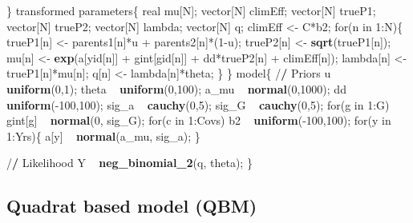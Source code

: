 \documentclass[12pt,]{article}
\newenvironment{Shaded}{\begin{snugshade}}{\end{snugshade}}
\newcommand{\KeywordTok}[1]{\textcolor[rgb]{0.13,0.29,0.53}{\textbf{{#1}}}}
\newcommand{\DecValTok}[1]{\textcolor[rgb]{0.00,0.00,0.81}{{#1}}}
\newcommand{\StringTok}[1]{\textcolor[rgb]{0.31,0.60,0.02}{{#1}}}
\newcommand{\ErrorTok}[1]{\textbf{{#1}}}
\newcommand{\NormalTok}[1]{{#1}}
\begin{document}
\begin{Shaded}
\begin{Highlighting}[]
\NormalTok{\}}
\NormalTok{transformed parameters\{}
  \NormalTok{real mu[N];}
  \NormalTok{vector[N] climEff;}
  \NormalTok{vector[N] trueP1;}
  \NormalTok{vector[N] trueP2;}
  \NormalTok{vector[N] lambda;}
  \NormalTok{vector[N] q;}
  \NormalTok{climEff <-}\StringTok{ }\NormalTok{C*b2;}
  \NormalTok{for(n in }\DecValTok{1}\NormalTok{:N)\{}
    \NormalTok{trueP1[n] <-}\StringTok{ }\NormalTok{parents1[n]*u +}\StringTok{ }\NormalTok{parents2[n]*(}\DecValTok{1}\NormalTok{-u);}
    \NormalTok{trueP2[n] <-}\StringTok{ }\KeywordTok{sqrt}\NormalTok{(trueP1[n]);}
    \NormalTok{mu[n] <-}\StringTok{ }\KeywordTok{exp}\NormalTok{(a[yid[n]] +}\StringTok{ }\NormalTok{gint[gid[n]] +}\StringTok{ }\NormalTok{dd*trueP2[n] +}\StringTok{ }\NormalTok{climEff[n]);}
    \NormalTok{lambda[n] <-}\StringTok{ }\NormalTok{trueP1[n]*mu[n];}
    \NormalTok{q[n] <-}\StringTok{ }\NormalTok{lambda[n]*theta;}
  \NormalTok{\}}
\NormalTok{\}}
\NormalTok{model\{}
  \NormalTok{/}\ErrorTok{/}\StringTok{ }\NormalTok{Priors}
  \NormalTok{u ~}\StringTok{ }\KeywordTok{uniform}\NormalTok{(}\DecValTok{0}\NormalTok{,}\DecValTok{1}\NormalTok{);}
  \NormalTok{theta ~}\StringTok{ }\KeywordTok{uniform}\NormalTok{(}\DecValTok{0}\NormalTok{,}\DecValTok{100}\NormalTok{);}
  \NormalTok{a_mu ~}\StringTok{ }\KeywordTok{normal}\NormalTok{(}\DecValTok{0}\NormalTok{,}\DecValTok{1000}\NormalTok{);}
  \NormalTok{dd ~}\StringTok{ }\KeywordTok{uniform}\NormalTok{(-}\DecValTok{100}\NormalTok{,}\DecValTok{100}\NormalTok{);}
  \NormalTok{sig_a ~}\StringTok{ }\KeywordTok{cauchy}\NormalTok{(}\DecValTok{0}\NormalTok{,}\DecValTok{5}\NormalTok{);}
  \NormalTok{sig_G ~}\StringTok{ }\KeywordTok{cauchy}\NormalTok{(}\DecValTok{0}\NormalTok{,}\DecValTok{5}\NormalTok{);}
  \NormalTok{for(g in }\DecValTok{1}\NormalTok{:G)}
      \NormalTok{gint[g] ~}\StringTok{ }\KeywordTok{normal}\NormalTok{(}\DecValTok{0}\NormalTok{, sig_G);}
  \NormalTok{for(c in }\DecValTok{1}\NormalTok{:Covs)}
    \NormalTok{b2 ~}\StringTok{ }\KeywordTok{uniform}\NormalTok{(-}\DecValTok{100}\NormalTok{,}\DecValTok{100}\NormalTok{);}
  \NormalTok{for(y in }\DecValTok{1}\NormalTok{:Yrs)\{}
    \NormalTok{a[y] ~}\StringTok{ }\KeywordTok{normal}\NormalTok{(a_mu, sig_a);}
  \NormalTok{\}}

  \NormalTok{/}\ErrorTok{/}\StringTok{ }\NormalTok{Likelihood}
  \NormalTok{Y ~}\StringTok{ }\KeywordTok{neg_binomial_2}\NormalTok{(q, theta);}
\NormalTok{\}}
\end{Highlighting}
\end{Shaded}

\subsection{Quadrat based model (QBM)}\label{quadrat-based-model-qbm}
\end{document}

